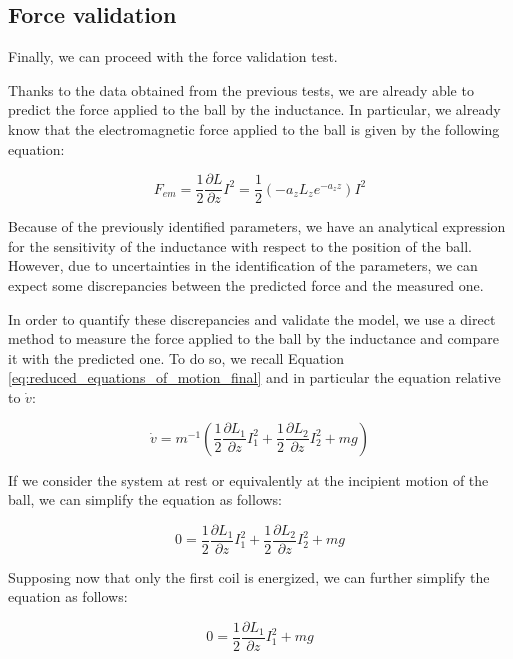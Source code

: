 \subsection{Force validation}
\label{subsec:force_validation}

Finally, we can proceed with the force validation test.

Thanks to the data obtained from the previous tests, we are already able to predict the force applied to the ball by the inductance.
In particular, we already know that the electromagnetic force applied to the ball is given by the following equation:

\begin{equation}
    F_{em} = \frac{1}{2} \frac{\partial L}{\partial z} I^2 = \frac{1}{2} (-a_z L_z e^{-a_z z}) I^2
\end{equation}

Because of the previously identified parameters, we have an analytical expression for the sensitivity of the inductance with respect to the position of the ball.
However, due to uncertainties in the identification of the parameters, we can expect some discrepancies between the predicted force and the measured one.

In order to quantify these discrepancies and validate the model, we use a direct method to measure the force applied to the ball by the inductance and compare it with the predicted one.
To do so, we recall Equation \ref{eq:reduced_equations_of_motion_final} and in particular the equation relative to $\dot{v}$:

\begin{equation}
    \dot{v} = m^{-1} \left(\frac{1}{2} \frac{\partial L_1}{\partial z} I_1^2 + \frac{1}{2} \frac{\partial L_2}{\partial z} I_2^2 + m g  \right)
\end{equation}

If we consider the system at rest or equivalently at the incipient motion of the ball, we can simplify the equation as follows:

\begin{equation}
    0 = \frac{1}{2} \frac{\partial L_1}{\partial z} I_1^2 + \frac{1}{2} \frac{\partial L_2}{\partial z} I_2^2 + m g
\end{equation}

Supposing now that only the first coil is energized, we can further simplify the equation as follows:

\begin{equation}
    0 = \frac{1}{2} \frac{\partial L_1}{\partial z} I_1^2 + m g
\end{equation}

